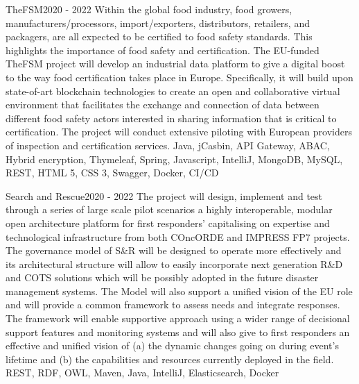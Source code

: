 \begin{projects}
	\project
	{TheFSM}{2020 - 2022}
	{}
	{Within the global food industry, food growers, manufacturers/processors, import/exporters, distributors, retailers, and packagers, are all expected to be certified to food safety standards. This highlights the importance of food safety and certification. The EU-funded TheFSM project will develop an industrial data platform to give a digital boost to the way food certification takes place in Europe. Specifically, it will build upon state-of-art blockchain technologies to create an open and collaborative virtual environment that facilitates the exchange and connection of data between different food safety actors interested in sharing information that is critical to certification. The project will conduct extensive piloting with European providers of inspection and certification services.}
	{Java, jCasbin, API Gateway, ABAC, Hybrid encryption, Thymeleaf, Spring, Javascript, IntelliJ, MongoDB, MySQL, REST, HTML 5, CSS 3, Swagger, Docker, CI/CD}

	\newpage

	\project
	{Search and Rescue}{2020 - 2022}
	{}
	{The project will design, implement and test through a series of large scale pilot scenarios a highly interoperable, modular open architecture platform for first responders’ capitalising on expertise and technological infrastructure from both COncORDE and IMPRESS FP7 projects. The governance model of S\&R will be designed to operate more effectively and its architectural structure will allow to easily incorporate next generation R\&D and COTS solutions which will be possibly adopted in the future disaster management systems. The Model will also support a unified vision of the EU role and will provide a common framework to assess needs and integrate responses. The framework will enable supportive approach using a wider range of decisional support features and monitoring systems and will also give to first responders an effective and unified vision of (a) the dynamic changes going on during event's lifetime and (b) the capabilities and resources currently deployed in the field.}
	{REST, RDF, OWL, Maven, Java, IntelliJ, Elasticsearch, Docker}


\end{projects}
